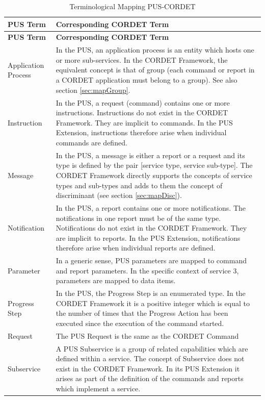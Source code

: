 \documentclass[a4paper,10pt]{article}
\begin{document}
\newpage
\begin{longtable}{|l|>{\raggedright\arraybackslash}p{10cm}|}
\caption{Terminological Mapping PUS-CORDET}\label{tab:termPusCr} \\
\hline
\rowcolor{light-gray}
\textbf{PUS Term} & \textbf{Corresponding CORDET Term} \\
\hline\hline
\endfirsthead
\rowcolor{light-gray}
\textbf{PUS Term} & \textbf{Corresponding CORDET Term} \\
\hline\hline
\endhead
Application Process & In the PUS, an application process is an entity which hosts one or more sub-services. In the CORDET Framework, the equivalent concept is that of group (each command or report in a CORDET application must belong to a group). See also section \ref{sec:mapGroup}. \\  
\hline
Instruction & In the PUS, a request (command) contains one or more instructions. Instructions do not exist in the CORDET Framework. They are implicit to commands. In the PUS Extension, instructions therefore arise when individual commands are defined. \\
\hline
Message & In the PUS, a message is either a report or a request and its type is defined by the pair [service type, service sub-type]. The CORDET Framework directly supports the concepts of service types and sub-types and adds to them the concept of discriminant (see section \ref{sec:mapDisc}). \\
\hline
Notification & In the PUS, a report contains one or more notifications. The notifications in one report must be of the same type. Notifications do not exist in the CORDET Framework. They are implicit to reports. In the PUS Extension, notifications therefore arise when individual reports are defined. \\
\hline
Parameter & In a generic sense, PUS parameters are mapped to command and report parameters. In the specific context of service 3, parameters are mapped to data items. \\
\hline
Progress Step & In the PUS, the Progress Step is an enumerated type. In the CORDET Framework it is a positive integer which is equal to the number of times that the Progress Action has been executed since the execution of the command started. \\
\hline
Request & The PUS Request is the same as the CORDET Command \\
\hline
Subservice & A PUS Subservice is a group of related capabilities which are defined within a service. The concept of Subservice does not exist in the CORDET Framework. In its PUS Extension it arises as part of the definition of the commands and reports which implement a service. \\

\end{longtable}
\end{document}
